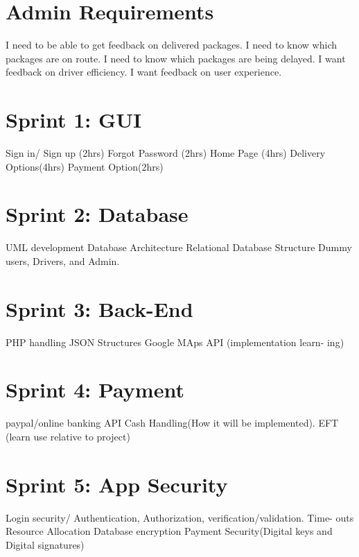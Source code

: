 \documentclass[a4paper]{article}
\begin{document}
\section{Admin Requirements}
I need to be able to get feedback on delivered packages. I need to know
which packages are on route. I need to know which packages are being
delayed. I want feedback on driver efficiency. I want feedback on user
experience.

\section{Sprint 1: GUI}
Sign in/ Sign up (2hrs) Forgot Password (2hrs) Home Page (4hrs) Delivery
Options(4hrs) Payment Option(2hrs)
\section{Sprint 2: Database}
UML development Database Architecture Relational Database Structure Dummy
users, Drivers, and Admin.
\section{Sprint 3: Back-End}
PHP handling JSON Structures Google MAps API (implementation learn-
ing)
\section{Sprint 4: Payment}
paypal/online banking API Cash Handling(How it will be implemented).
EFT (learn use relative to project)
\section{Sprint 5: App Security}
Login security/ Authentication, Authorization, verification/validation. Time-
outs Resource Allocation Database encryption Payment Security(Digital
keys and Digital signatures)
\end{document}
